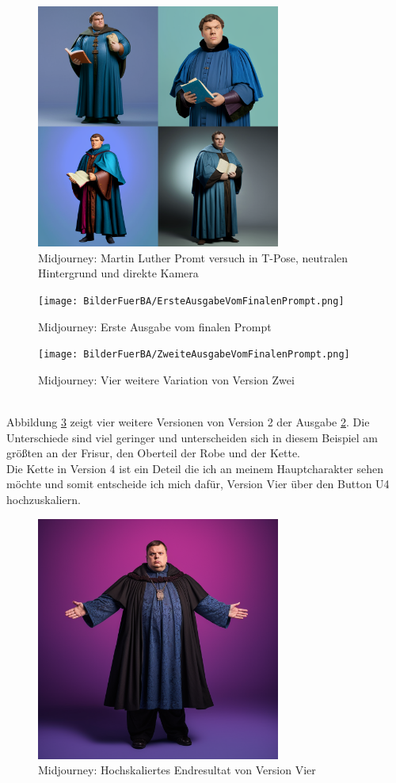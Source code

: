 \begin{figure}
	\centering
	\includegraphics[width=8.022cm]{BilderFuerBA/MartinLutherInTPoseFirst.png}
	\caption{Midjourney: Martin Luther Promt versuch in T-Pose, neutralen Hintergrund und direkte Kamera}
	\label{MartinLutherInTPoseNeutralerHintergrundDirekteKamera}
\end{figure}
\begin{figure}
	\centering
	\texttt{[image: BilderFuerBA/ErsteAusgabeVomFinalenPrompt.png]}
	\caption{Midjourney: Erste Ausgabe vom finalen Prompt}
	\label{ErsteAusgabeVomFinalenPrompt}
\end{figure}
\begin{figure}
	\centering
	\texttt{[image: BilderFuerBA/ZweiteAusgabeVomFinalenPrompt.png]}
	\caption{Midjourney: Vier weitere Variation von Version Zwei}
	\label{ZweiteAusgabeVomFinalenPrompt}
\end{figure}
\\
Abbildung \ref{ZweiteAusgabeVomFinalenPrompt} zeigt vier weitere Versionen von Version 2 der Ausgabe \ref{ErsteAusgabeVomFinalenPrompt}. Die Unterschiede sind viel geringer und unterscheiden sich in diesem Beispiel am größten an der Frisur, den Oberteil der Robe und der Kette.
\\
Die Kette in Version 4 ist ein Deteil die ich an meinem Hauptcharakter sehen möchte und somit entscheide ich mich dafür, Version Vier über den Button U4 hochzuskaliern.
\begin{figure}
	\centering
	\includegraphics[width=8.022cm]{BilderFuerBA/DritteAusgabeVomFinalenPrompt.png}
	\caption{Midjourney: Hochskaliertes Endresultat von Version Vier}
	\label{DritteAusgabeVomFinalenPrompt}
\end{figure}
